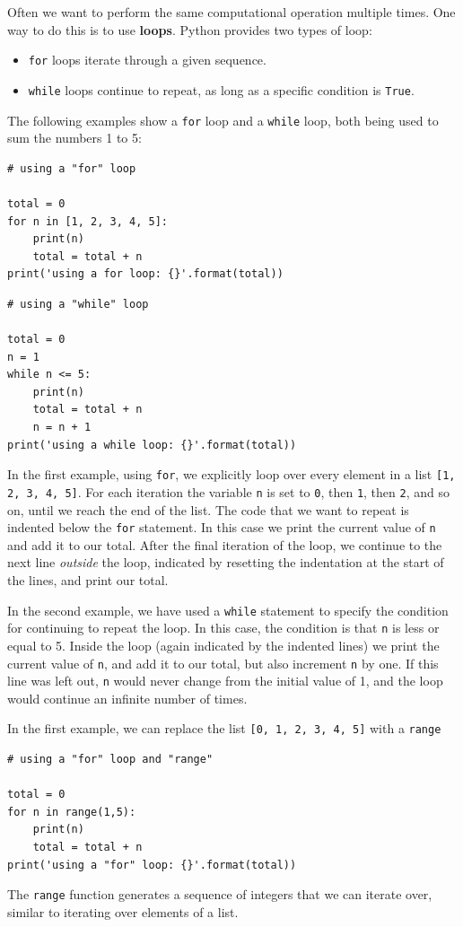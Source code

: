 \documentclass[a4paper]{article}
\begin{document}
Often we want to perform the same computational operation multiple times. One way to do this is to use \textbf{loops}. Python provides two types of loop:
\begin{itemize}
	\item{\texttt{for} loops iterate through a given sequence.}
	\item{\texttt{while} loops continue to repeat, as long as a specific condition is \texttt{True}.}
\end{itemize}
The following examples show a \texttt{for} loop and a \texttt{while} loop, both being used to sum the numbers 1 to 5:
\begin{lstlisting}
# using a "for" loop

total = 0
for n in [1, 2, 3, 4, 5]:
    print(n)
    total = total + n
print('using a for loop: {}'.format(total))
\end{lstlisting}
\begin{lstlisting}
# using a "while" loop

total = 0
n = 1
while n <= 5:
    print(n)
    total = total + n
    n = n + 1
print('using a while loop: {}'.format(total))
\end{lstlisting}
In the first example, using \texttt{for}, we explicitly loop over every element in a list \texttt{[1, 2, 3, 4, 5]}. For each iteration the variable \texttt{n} is set to \texttt{0}, then \texttt{1}, then \texttt{2}, and so on, until we reach the end of the list. The code that we want to repeat is indented below the \texttt{for} statement. In this case we print the current value of \texttt{n} and add it to our total. After the final iteration of the loop, we continue to the next line \emph{outside} the loop, indicated by resetting the indentation at the start of the lines, and print our total.

In the second example, we have used a \texttt{while} statement to specify the condition for continuing to repeat the loop. In this case, the condition is that \texttt{n} is less or equal to 5. Inside the loop (again indicated by the indented lines) we print the current value of \texttt{n}, and add it to our total, but also increment \texttt{n} by one. If this line was left out, \texttt{n} would never change from the initial value of 1, and the loop would continue an infinite number of times.

In the first example, we can replace the list \texttt{[0, 1, 2, 3, 4, 5]} with a \texttt{range}
\begin{lstlisting}
# using a "for" loop and "range"

total = 0
for n in range(1,5):
    print(n)
    total = total + n
print('using a "for" loop: {}'.format(total))
\end{lstlisting}
The \texttt{range} function generates a sequence of integers that we can iterate over, similar to iterating over elements of a list.
\end{document}
